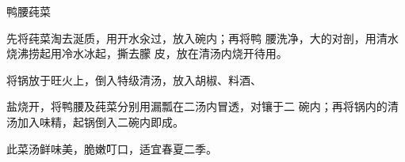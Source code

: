\begin{recipe}{鸭腰莼菜}

\ingredients


\cooking

\step 先将莼菜淘去涎质，用开水汆过，放入碗内；再将鸭 腰洗净，大的对剖，用清水烧沸捞起用冷水冰起，撕去朦 皮，放在清汤内烧开待用。

\step 将锅放于旺火上，倒入特级清汤，放入胡椒、料酒、

盐烧开，将鸭腰及莼菜分别用漏瓢在二汤内冒透，对镶于二 碗内；再将锅内的清汤加入味精，起锅倒入二碗内即成。

\notes

此菜汤鲜味美，脆嫩叮口，适宜春夏二季。

\end{recipe}

